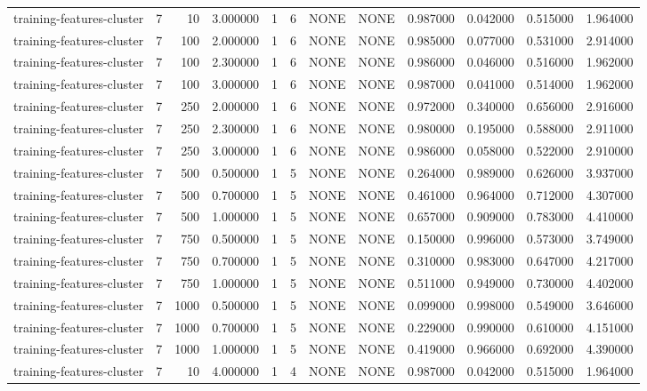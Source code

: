 \begin{tabular}{lrrrllllrrrr}
training-features-cluster & 7 & 10 & 3.000000 & 1 & 6 & NONE & NONE & 0.987000 & 0.042000 & 0.515000 & 1.964000 \\
training-features-cluster & 7 & 100 & 2.000000 & 1 & 6 & NONE & NONE & 0.985000 & 0.077000 & 0.531000 & 2.914000 \\
training-features-cluster & 7 & 100 & 2.300000 & 1 & 6 & NONE & NONE & 0.986000 & 0.046000 & 0.516000 & 1.962000 \\
training-features-cluster & 7 & 100 & 3.000000 & 1 & 6 & NONE & NONE & 0.987000 & 0.041000 & 0.514000 & 1.962000 \\
training-features-cluster & 7 & 250 & 2.000000 & 1 & 6 & NONE & NONE & 0.972000 & 0.340000 & 0.656000 & 2.916000 \\
training-features-cluster & 7 & 250 & 2.300000 & 1 & 6 & NONE & NONE & 0.980000 & 0.195000 & 0.588000 & 2.911000 \\
training-features-cluster & 7 & 250 & 3.000000 & 1 & 6 & NONE & NONE & 0.986000 & 0.058000 & 0.522000 & 2.910000 \\
training-features-cluster & 7 & 500 & 0.500000 & 1 & 5 & NONE & NONE & 0.264000 & 0.989000 & 0.626000 & 3.937000 \\
training-features-cluster & 7 & 500 & 0.700000 & 1 & 5 & NONE & NONE & 0.461000 & 0.964000 & 0.712000 & 4.307000 \\
training-features-cluster & 7 & 500 & 1.000000 & 1 & 5 & NONE & NONE & 0.657000 & 0.909000 & 0.783000 & 4.410000 \\
training-features-cluster & 7 & 750 & 0.500000 & 1 & 5 & NONE & NONE & 0.150000 & 0.996000 & 0.573000 & 3.749000 \\
training-features-cluster & 7 & 750 & 0.700000 & 1 & 5 & NONE & NONE & 0.310000 & 0.983000 & 0.647000 & 4.217000 \\
training-features-cluster & 7 & 750 & 1.000000 & 1 & 5 & NONE & NONE & 0.511000 & 0.949000 & 0.730000 & 4.402000 \\
training-features-cluster & 7 & 1000 & 0.500000 & 1 & 5 & NONE & NONE & 0.099000 & 0.998000 & 0.549000 & 3.646000 \\
training-features-cluster & 7 & 1000 & 0.700000 & 1 & 5 & NONE & NONE & 0.229000 & 0.990000 & 0.610000 & 4.151000 \\
training-features-cluster & 7 & 1000 & 1.000000 & 1 & 5 & NONE & NONE & 0.419000 & 0.966000 & 0.692000 & 4.390000 \\
training-features-cluster & 7 & 10 & 4.000000 & 1 & 4 & NONE & NONE & 0.987000 & 0.042000 & 0.515000 & 1.964000 \\

\end{tabular}
